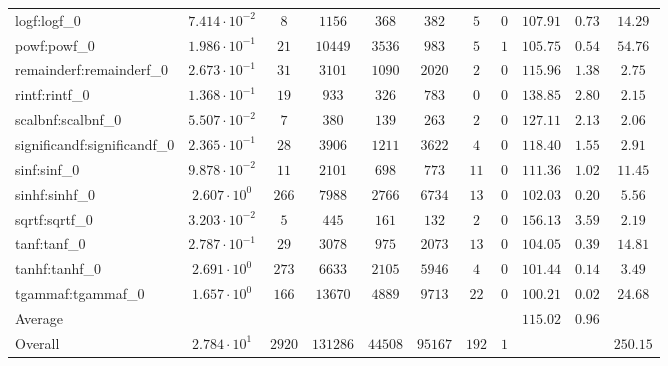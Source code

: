\begin{tabular}{|l|c|c|c|c|c|c|c|c|c|c|}
logf:logf\_0                 & $ 7.414 \cdot 10^{-2} $ & $ 8      $ & $ 1156   $ & $ 368   $ & $ 382   $ & $ 5   $ & $ 0 $ & $ 107.91      $ & $ 0.73    $ & $ 14.29   $ \\
powf:powf\_0                 & $ 1.986 \cdot 10^{-1} $ & $ 21     $ & $ 10449  $ & $ 3536  $ & $ 983   $ & $ 5   $ & $ 1 $ & $ 105.75      $ & $ 0.54    $ & $ 54.76   $ \\
remainderf:remainderf\_0     & $ 2.673 \cdot 10^{-1} $ & $ 31     $ & $ 3101   $ & $ 1090  $ & $ 2020  $ & $ 2   $ & $ 0 $ & $ 115.96      $ & $ 1.38    $ & $ 2.75    $ \\
rintf:rintf\_0               & $ 1.368 \cdot 10^{-1} $ & $ 19     $ & $ 933    $ & $ 326   $ & $ 783   $ & $ 0   $ & $ 0 $ & $ 138.85      $ & $ 2.80    $ & $ 2.15    $ \\
scalbnf:scalbnf\_0           & $ 5.507 \cdot 10^{-2} $ & $ 7      $ & $ 380    $ & $ 139   $ & $ 263   $ & $ 2   $ & $ 0 $ & $ 127.11      $ & $ 2.13    $ & $ 2.06    $ \\
significandf:significandf\_0 & $ 2.365 \cdot 10^{-1} $ & $ 28     $ & $ 3906   $ & $ 1211  $ & $ 3622  $ & $ 4   $ & $ 0 $ & $ 118.40      $ & $ 1.55    $ & $ 2.91    $ \\
sinf:sinf\_0                 & $ 9.878 \cdot 10^{-2} $ & $ 11     $ & $ 2101   $ & $ 698   $ & $ 773   $ & $ 11  $ & $ 0 $ & $ 111.36      $ & $ 1.02    $ & $ 11.45   $ \\
sinhf:sinhf\_0               & $ 2.607 \cdot 10^{0}  $ & $ 266    $ & $ 7988   $ & $ 2766  $ & $ 6734  $ & $ 13  $ & $ 0 $ & $ 102.03      $ & $ 0.20    $ & $ 5.56    $ \\
sqrtf:sqrtf\_0               & $ 3.203 \cdot 10^{-2} $ & $ 5      $ & $ 445    $ & $ 161   $ & $ 132   $ & $ 2   $ & $ 0 $ & $ 156.13      $ & $ 3.59    $ & $ 2.19    $ \\
tanf:tanf\_0                 & $ 2.787 \cdot 10^{-1} $ & $ 29     $ & $ 3078   $ & $ 975   $ & $ 2073  $ & $ 13  $ & $ 0 $ & $ 104.05      $ & $ 0.39    $ & $ 14.81   $ \\
tanhf:tanhf\_0               & $ 2.691 \cdot 10^{0}  $ & $ 273    $ & $ 6633   $ & $ 2105  $ & $ 5946  $ & $ 4   $ & $ 0 $ & $ 101.44      $ & $ 0.14    $ & $ 3.49    $ \\
tgammaf:tgammaf\_0           & $ 1.657 \cdot 10^{0}  $ & $ 166    $ & $ 13670  $ & $ 4889  $ & $ 9713  $ & $ 22  $ & $ 0 $ & $ 100.21      $ & $ 0.02    $ & $ 24.68   $ \\
\hline
Average                      & $                     $ & $        $ & $        $ & $       $ & $       $ & $     $ & $   $ & $ 115.02      $ & $ 0.96    $ & $         $ \\
\hline
Overall                      & $ 2.784 \cdot 10^{1}  $ & $ 2920   $ & $ 131286 $ & $ 44508 $ & $ 95167 $ & $ 192 $ & $ 1 $ & $             $ & $         $ & $ 250.15  $ \\
\hline
\end{tabular}
